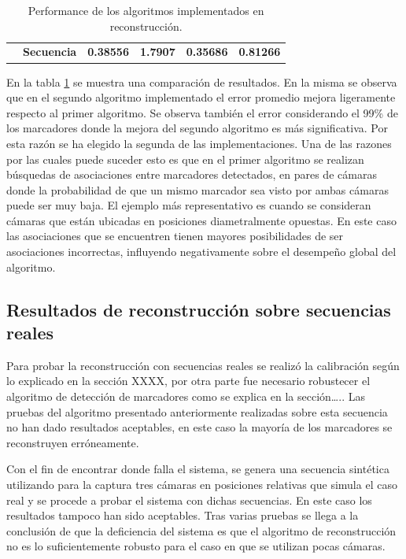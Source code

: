 \begin{table}[h]
\begin{tabular}{ll|l|l|l|l|}
\multicolumn{1}{l|}{}                                                         & \textbf{Secuencia }                                            & \textbf{0.38556 }                                                         & \textbf{1.7907    }                                                    & \textbf{0.35686}                                                         &\textbf{ 0.81266}                                                       \\ \cline{2-6} 
\end{tabular}
\caption{Performance de los algoritmos implementados en reconstrucción. }
\label{table_performance_reconstruccion}
\end{table}

En la tabla \ref{table_performance_reconstruccion} se muestra una comparación de resultados. En la misma se observa que en el segundo algoritmo implementado el error promedio mejora ligeramente respecto al primer algoritmo. Se observa también el error considerando el 99\% de los marcadores donde la mejora del segundo algoritmo es más significativa. Por esta razón se ha elegido la segunda de las implementaciones.
Una de las razones por las cuales puede suceder esto es que en el primer algoritmo se realizan búsquedas de asociaciones entre marcadores detectados, en pares de cámaras donde la probabilidad de que un mismo marcador sea visto por ambas cámaras puede ser muy baja. El ejemplo más representativo es cuando se consideran cámaras que están  ubicadas en posiciones diametralmente opuestas. En este caso las asociaciones que se encuentren tienen mayores posibilidades de ser asociaciones incorrectas, influyendo negativamente sobre el desempeño global del algoritmo. 



\subsection{Resultados de reconstrucción sobre secuencias reales}

Para probar la reconstrucción con secuencias reales se realizó la calibración según lo explicado en la sección XXXX, por otra parte fue necesario robustecer el algoritmo de detección de marcadores como se explica en la sección….. Las pruebas del algoritmo presentado anteriormente realizadas sobre esta secuencia no han dado resultados aceptables, en este caso la mayoría de los marcadores se reconstruyen erróneamente. 


Con el fin de encontrar donde falla el sistema, se genera una secuencia sintética utilizando  para la captura tres cámaras en posiciones relativas que simula el caso real y se procede a probar el sistema con dichas secuencias.  En este caso los resultados tampoco han sido aceptables. Tras varias pruebas se llega  a la conclusión de que la deficiencia del sistema es que el algoritmo de reconstrucción no es lo suficientemente robusto para el caso en que se utilizan pocas cámaras.\\


